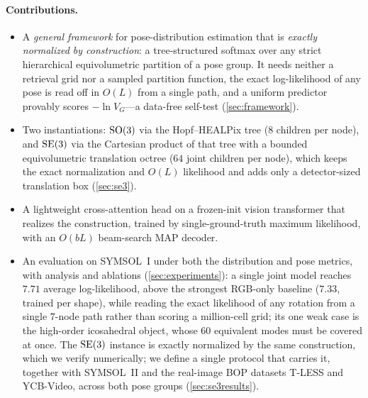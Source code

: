 \paragraph{Contributions.}
\begin{itemize}
  \item A \emph{general framework} for pose-distribution estimation that is
  \emph{exactly normalized by construction}: a tree-structured softmax over any
  strict hierarchical equivolumetric partition of a pose group. It needs neither a
  retrieval grid nor a sampled partition function, the exact log-likelihood of any
  pose is read off in $O(L)$ from a single path, and a uniform predictor provably
  scores $-\ln V_G$---a data-free self-test (\cref{sec:framework}).
  \item Two instantiations: $\mathrm{SO}(3)$ via the Hopf--HEALPix tree ($8$ children per
  node), and $\mathrm{SE}(3)$ via the Cartesian product of that tree with a bounded
  equivolumetric translation octree ($64$ joint children per node), which keeps the
  exact normalization and $O(L)$ likelihood and adds only a detector-sized
  translation box (\cref{sec:se3}).
  \item A lightweight cross-attention head on a frozen-init vision transformer that
  realizes the construction, trained by single-ground-truth maximum likelihood, with
  an $O(bL)$ beam-search MAP decoder.
  \item An evaluation on SYMSOL~I under both the distribution and pose metrics, with
  analysis and ablations (\cref{sec:experiments}): a single joint model reaches
  $7.71$ average log-likelihood, above the strongest RGB-only baseline ($7.33$,
  trained per shape), while reading the exact likelihood of any rotation from a
  single $7$-node path rather than scoring a million-cell grid; its one weak case is
  the high-order icosahedral object, whose $60$ equivalent modes must be covered at
  once. The $\mathrm{SE}(3)$ instance is exactly normalized by the same construction, which
  we verify numerically; we define a single protocol that carries it, together with
  SYMSOL~II and the real-image BOP datasets T-LESS and YCB-Video, across both pose
  groups (\cref{sec:se3results}).
\end{itemize}

